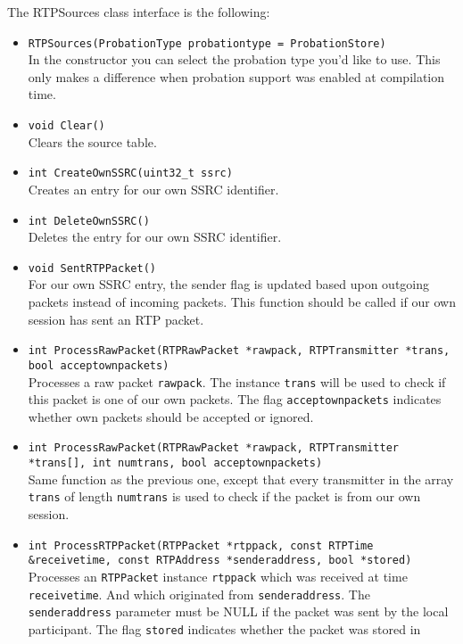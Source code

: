 \documentclass[12pt,a4paper]{article}
\begin{document}
				The RTPSources class interface is the following:
				\begin{itemize}
					\item {\tt RTPSources(ProbationType probationtype = ProbationStore)}\\
						In the constructor you can select the probation type you'd like
						to use. This only makes a difference when probation support was
						enabled at compilation time.
					\item {\tt void Clear()}\\
						Clears the source table.
					\item {\tt int CreateOwnSSRC(uint32\_t ssrc)}\\
						Creates an entry for our own SSRC identifier.
					\item {\tt int DeleteOwnSSRC()}\\
						Deletes the entry for our own SSRC identifier.
					\item {\tt void SentRTPPacket()}\\
						For our own SSRC entry, the sender flag is updated based
						upon outgoing packets instead of incoming packets. This
						function should be called if our own session has sent an
						RTP packet.
					\item {\tt int ProcessRawPacket(RTPRawPacket *rawpack, RTPTransmitter *trans, bool acceptownpackets)}\\
						Processes a raw packet {\tt rawpack}. The instance {\tt trans} will be used to
						check if this packet is one of our own packets. The flag {\tt acceptownpackets}
						indicates whether own packets should be accepted or ignored.
					\item {\tt int ProcessRawPacket(RTPRawPacket *rawpack, RTPTransmitter *trans[], int numtrans, bool acceptownpackets)}\\
						Same function as the previous one, except that every transmitter
						in the array {\tt trans} of length {\tt numtrans} is used
						to check if the packet is from our own session.
					\item {\tt int ProcessRTPPacket(RTPPacket *rtppack, const RTPTime \&receivetime, const RTPAddress *senderaddress, bool *stored)}\\
						Processes an {\tt RTPPacket} instance {\tt rtppack} which was 
						received at time {\tt receivetime}. And which originated from
						{\tt senderaddress}. The {\tt senderaddress} parameter must
						be NULL if the packet was sent by the local participant. The
						flag {\tt stored} indicates whether the packet was stored in

\end{itemize}
\end{document}
